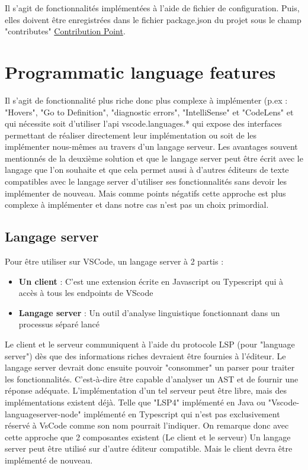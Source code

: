 \documentclass[
    iict, %
    il, %
]{heig-tb}
\begin{document}
Il s’agit de fonctionnalités implémentées à l’aide de fichier de configuration.
Puis, elles doivent être enregistrées dans le fichier package.json du projet sous le champ "contributes" \space \href{https://code.visualstudio.com/api/references/contribution-points}{ Contribution Point}.

\section{Programmatic language features}
Il s’agit de fonctionnalité plus riche donc plus complexe à implémenter (p.ex : "Hovers", "Go to Definition", "diagnostic errors", "IntelliSense" \space et "CodeLens" et qui nécessite soit d’utiliser l’api vscode.languages.* qui expose des interfaces permettant de réaliser directement leur implémentation ou soit de les implémenter nous-mêmes au travers d’un langage serveur. 
Les avantages souvent mentionnés de la deuxième solution et que le langage server peut être écrit avec le langage que l’on souhaite et que cela permet aussi à d’autres éditeurs de texte compatibles avec le langage server d’utiliser ses fonctionnalités sans devoir les implémenter de nouveau. Mais comme points négatifs cette approche est plus complexe à implémenter et dans notre cas n’est pas un choix primordial.

\subsection{Langage server}
Pour être utiliser sur VSCode, un langage server à 2 partis :
\begin{itemize}
    \item \textbf{Un client} : C’est une extension écrite en Javascript ou Typescript qui à accès à tous les endpoints de VScode
    \item \textbf{Langage server} : Un outil d'analyse linguistique fonctionnant dans un processus séparé lancé
\end{itemize}

Le client et le serveur communiquent à l’aide du protocole LSP (pour "language server") dès que des informations riches devraient être fournies à l’éditeur.
Le langage server devrait donc ensuite pouvoir "consommer" un parser pour traiter les fonctionnalités. C’est-à-dire être capable d’analyser un AST et de fournir une réponse adéquate.
L’implémentation d’un tel serveur peut être libre, mais des implémentations existent déjà. Telle que "LSP4" implémenté en Java ou  "Vscode-languageserver-node" implémenté en Typescript qui n’est pas exclusivement réservé à VsCode comme son nom pourrait l’indiquer.
On remarque donc avec cette approche que 2 composantes existent (Le client et le serveur)
Un langage server peut être utilisé sur d’autre éditeur compatible. Mais le client devra être implémenté de nouveau.
\end{document}
